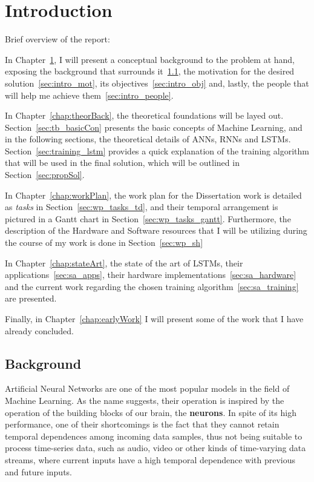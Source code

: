 \chapter{Introduction}\label{chap:intro}
Brief overview of the report:

In Chapter~\ref{chap:intro}, I will present a conceptual background to the problem at hand, exposing the background that surrounds it~\ref{sec:intro_back}, the motivation for the desired solution~\ref{sec:intro_mot}, its objectives~\ref{sec:intro_obj} and, lastly, the people that will help me achieve them~\ref{sec:intro_people}.

In Chapter~\ref{chap:theorBack}, the theoretical foundations will be layed out. Section~\ref{sec:tb_basicCon} presents the basic concepts of Machine Learning, and in the following sections, the theoretical details of ANNs, RNNs and LSTMs. Section~\ref{sec:training_lstm} provides a quick explanation of the training algorithm that will be used in the final solution, which will be outlined in Section~\ref{sec:propSol}.

In Chapter~\ref{chap:workPlan}, the work plan for the Dissertation work is detailed as \emph{tasks} in Section~\ref{sec:wp_tasks_td}, and their temporal arrangement is pictured in a Gantt chart in Section~\ref{sec:wp_tasks_gantt}. Furthermore, the description of the Hardware and Software resources that I will be utilizing during the course of my work is done in Section~\ref{sec:wp_sh}

In Chapter~\ref{chap:stateArt}, the state of the art of LSTMs, their applications~\ref{sec:sa_apps}, their hardware implementations~\ref{sec:sa_hardware} and the current work regarding the chosen training algorithm~\ref{sec:sa_training} are presented.

Finally, in Chapter~\ref{chap:earlyWork} I will present some of the work that I have already concluded.

\section{Background}\label{sec:intro_back}
Artificial Neural Networks are one of the most popular models in the field of Machine Learning. As the name suggests, their operation is inspired by the operation of the building blocks of our brain, the \textbf{neurons}. In spite of its high performance, one of their shortcomings is the fact that they cannot retain temporal dependences among incoming data samples, thus not being suitable to process time-series data, such as audio, video or other kinds of time-varying data streams, where current inputs have a high temporal dependence with previous and future inputs. 

